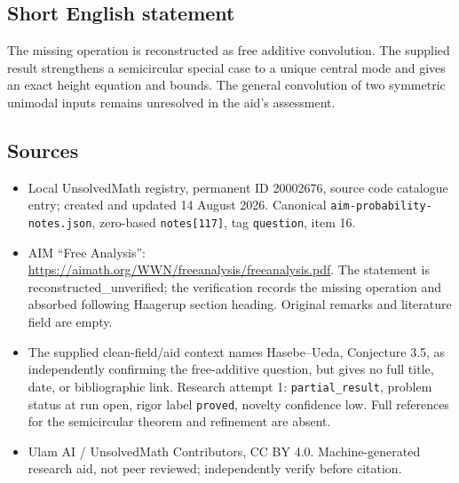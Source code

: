 \documentclass[11pt]{article}
\begin{document}
\subsection{Short English statement}
The missing operation is reconstructed as free additive convolution. The supplied result strengthens a semicircular special case to a unique central mode and gives an exact height equation and bounds. The general convolution of two symmetric unimodal inputs remains unresolved in the aid's assessment.
\subsection{Sources}
\begin{itemize}
\item Local UnsolvedMath registry, permanent ID 20002676, source code catalogue entry; created and updated 14 August 2026. Canonical \texttt{aim-probability-notes.json}, zero-based \texttt{notes[117]}, tag \texttt{question}, item 16.
\item AIM ``Free Analysis'': \url{https://aimath.org/WWN/freeanalysis/freeanalysis.pdf}. The statement is reconstructed\_unverified; the verification records the missing operation and absorbed following Haagerup section heading. Original remarks and literature field are empty.
\item The supplied clean-field/aid context names Hasebe--Ueda, Conjecture 3.5, as independently confirming the free-additive question, but gives no full title, date, or bibliographic link. Research attempt 1: \texttt{partial\_result}, problem status at run open, rigor label \texttt{proved}, novelty confidence low. Full references for the semicircular theorem and refinement are absent.
\item Ulam AI / UnsolvedMath Contributors, CC BY 4.0. Machine-generated research aid, not peer reviewed; independently verify before citation.
\end{itemize}
\end{document}
